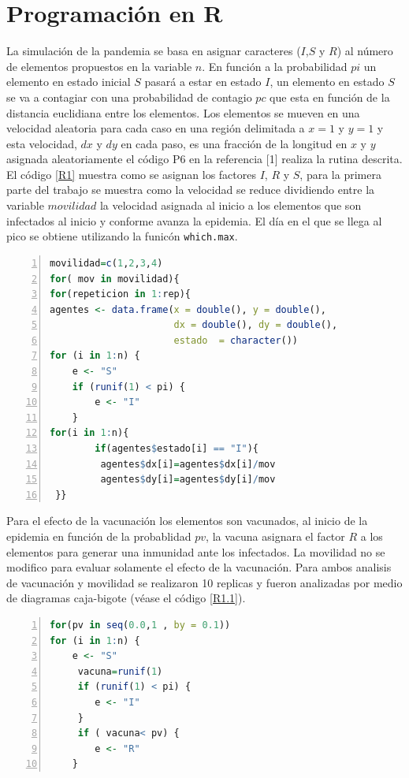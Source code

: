 \documentclass{article}
\begin{document}
\section{Programación en R}
La simulación de la pandemia se basa en asignar caracteres ($I$,$S$ y $R$) al número de elementos propuestos en la variable $n$. En función a la probabilidad $pi$ un elemento en estado inicial $S$ pasará a estar en estado $I$, un elemento en estado $S$ se va a contagiar con una probabilidad de contagio $pc$ que esta en función de la distancia euclidiana entre los elementos. Los elementos se mueven en una velocidad aleatoria para cada caso en una región delimitada a $x=1$ y $y=1$ y esta velocidad, $dx$ y $dy$ en cada paso, es una fracción de la longitud en $x$ y $y$ asignada aleatoriamente el código P6 en la referencia [1] realiza la rutina descrita. El código \ref{R1} muestra como se asignan los factores $I$, $R$ y $S$, para la primera parte del trabajo se muestra como la velocidad se reduce dividiendo entre la variable $movilidad$ la velocidad asignada al inicio a los elementos que son infectados al inicio y conforme avanza la epidemia. El día en el que se llega al pico se obtiene utilizando la funicón \texttt{which.max}.





\lstset{basicstyle=\ttfamily, keywordstyle=\bfseries}
\begin{lstlisting}[frame=single,numbers=left,language=R,caption=Asignación de los factores para los elementos y reducción de la velocidad con la variable $movilidad$ para los elementos infectados \label{R1}]
 movilidad=c(1,2,3,4)
for( mov in movilidad){
for(repeticion in 1:rep){
agentes <- data.frame(x = double(), y = double(),
                      dx = double(), dy = double(),
                      estado  = character())
for (i in 1:n) {
    e <- "S"
    if (runif(1) < pi) {
        e <- "I"
    }
for(i in 1:n){
        if(agentes$estado[i] == "I"){
         agentes$dx[i]=agentes$dx[i]/mov
         agentes$dy[i]=agentes$dy[i]/mov 
 }}

\end{lstlisting}  
Para el efecto de la vacunación los elementos son vacunados, al inicio de la epidemia en función de la probablidad $pv$, la vacuna asignara el factor $R$ a los elementos para generar una inmunidad ante los infectados. La movilidad no se modifico para evaluar solamente el efecto de la vacunación. Para ambos analisis de vacunación y movilidad se realizaron 10 replicas y fueron analizadas por medio de diagramas caja-bigote (véase el código \ref{R1.1}).
\lstset{basicstyle=\ttfamily, keywordstyle=\bfseries}
\begin{lstlisting}[frame=single,numbers=left,language=R,caption=Vacunación en función de $pv$ para generar inmunidad al inicio de la epidemia. \label{R1.1}]
for(pv in seq(0.0,1 , by = 0.1))
for (i in 1:n) {
    e <- "S"
     vacuna=runif(1)
     if (runif(1) < pi) {
        e <- "I"
     }
     if ( vacuna< pv) {
        e <- "R"
    }
\end{lstlisting}
\end{document}
